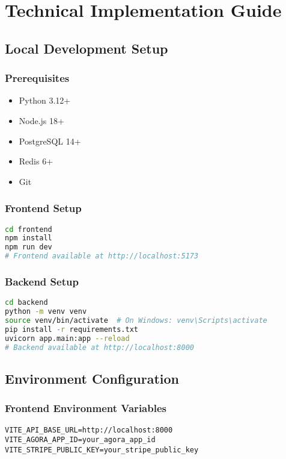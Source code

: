 \documentclass[11pt,a4paper]{article}
\begin{document}
\section{Technical Implementation Guide}

\subsection{Local Development Setup}

\subsubsection{Prerequisites}
\begin{itemize}
    \item Python 3.12+
    \item Node.js 18+
    \item PostgreSQL 14+
    \item Redis 6+
    \item Git
\end{itemize}

\subsubsection{Frontend Setup}
\begin{lstlisting}[language=bash, caption=Frontend Installation]
cd frontend
npm install
npm run dev
# Frontend available at http://localhost:5173
\end{lstlisting}

\subsubsection{Backend Setup}
\begin{lstlisting}[language=bash, caption=Backend Installation]
cd backend
python -m venv venv
source venv/bin/activate  # On Windows: venv\Scripts\activate
pip install -r requirements.txt
uvicorn app.main:app --reload
# Backend available at http://localhost:8000
\end{lstlisting}

\subsection{Environment Configuration}

\subsubsection{Frontend Environment Variables}
\begin{lstlisting}[caption=Frontend .env File]
VITE_API_BASE_URL=http://localhost:8000
VITE_AGORA_APP_ID=your_agora_app_id
VITE_STRIPE_PUBLIC_KEY=your_stripe_public_key
\end{lstlisting}
\end{document}
